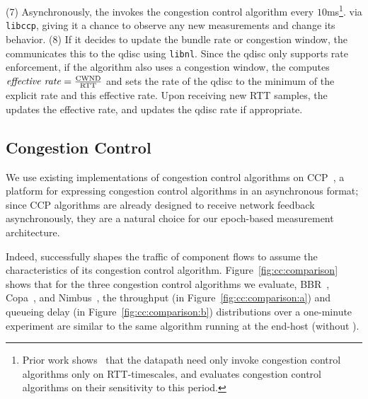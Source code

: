 (7) Asynchronously, the \inbox invokes the congestion control algorithm every $10$ms\footnote{Prior work shows~\cite{ccp} that the datapath need only invoke congestion control algorithms only on RTT-timescales, and evaluates congestion control algorithms on their sensitivity to this period.}.
via \texttt{libccp},
giving it a chance to observe any new measurements and change its behavior. (8) If it decides to update
the bundle rate or congestion window, the \inbox communicates this to the qdisc
using \texttt{libnl}. Since the qdisc only supports rate enforcement, if the algorithm
also uses a congestion window, the \inbox computes $\text{\emph{effective rate}} = \frac{\text{CWND}}{\text{RTT}}$
and sets the rate of the qdisc to the minimum of the explicit rate and this effective rate.
Upon receiving new RTT samples, the \inbox updates the effective rate, and updates the qdisc rate if appropriate.


\subsection{Congestion Control}\label{s:impl:cc}
We use existing implementations of congestion control algorithms on CCP~\cite{ccp}, a platform for expressing congestion control algorithms in an asynchronous format; since CCP algorithms are already designed to receive network feedback asynchronously, they are a natural choice for our epoch-based measurement architecture. 


Indeed, \name successfully shapes the traffic of component flows to assume the characteristics of its congestion control algorithm.
Figure~\ref{fig:cc:comparison} shows that for the three congestion control algorithms we evaluate, BBR~\cite{bbr}, Copa~\cite{copa}, and Nimbus~\cite{nimbus}, the throughput (in Figure~\ref{fig:cc:comparison:a}) and queueing delay (in Figure~\ref{fig:cc:comparison:b}) distributions over a one-minute experiment are similar to the same algorithm running at the end-host (\ie without \name).


